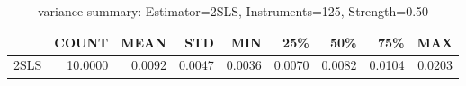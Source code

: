 \begin{table}[ht]
\centering
\caption{variance summary: Estimator=2SLS, Instruments=125, Strength=0.50}
\begin{tabular}{lrrrrrrrr}
\toprule
 & COUNT & MEAN & STD & MIN & 25\% & 50\% & 75\% & MAX \\
\midrule
2SLS & 10.0000 & 0.0092 & 0.0047 & 0.0036 & 0.0070 & 0.0082 & 0.0104 & 0.0203 \\
\bottomrule
\end{tabular}
\end{table}
